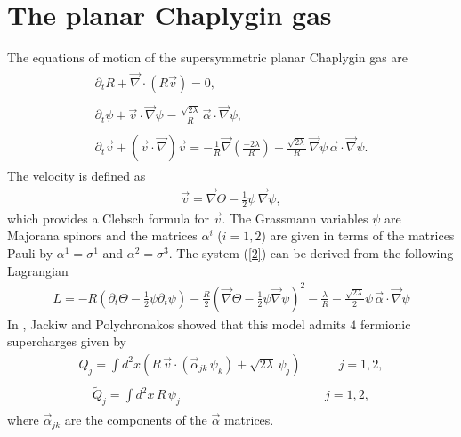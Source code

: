 \documentclass[11pt,a4paper]{article}
\let\ssection=\section
\renewcommand{\section}{\setcounter{equation}{0}\ssection}
\begin{document}
\section{The planar Chaplygin gas}
The equations of motion of the supersymmetric planar Chaplygin gas are
\begin{eqnarray}
\begin{array}{l}
\partial_t R+\vec{\nabla}\cdot(R\vec{v})=0,\\
[0.5mm]\\
\displaystyle{\partial_t\psi+\vec{v}\cdot\vec{\nabla}\psi=\frac{\sqrt{2\lambda}}{R}\,\vec{\alpha}\cdot\vec{\nabla}\psi},\\
[0.5mm]\\
\displaystyle{\partial_t\vec{v}+(\vec{v}\cdot\vec{\nabla})\vec{v}=
-\frac{1}{R}\vec{\nabla}\left(\frac{-2\lambda}{R}\right)+\frac{\sqrt{2\lambda}}{R}\,\vec{\nabla}\psi\,\vec{\alpha}\cdot\vec{\nabla}\psi}.
\end{array}
\label{2}
\end{eqnarray}
The velocity is defined as 
\begin{eqnarray}
\vec{v}=\vec{\nabla}\Theta-\frac{1}{2}\psi\,\vec{\nabla}\psi,
\label{clebsch}
\end{eqnarray}
which provides a Clebsch formula \cite{DESER} for $\vec{v}$. The Grassmann variables $\psi$ are Majorana spinors and the matrices $\alpha^i$ ($i=1, 2$) are given in terms of the matrices Pauli by $\alpha^1=\sigma^1$ and $\alpha^2=\sigma^3$. The system (\ref{2}) can be derived from the following Lagrangian
\begin{eqnarray}
L=-R\left(\partial_t\Theta-\frac{1}{2}\psi\partial_t\psi\right)-\frac{R}{2}\left(\vec{\nabla}\Theta-\frac{1}{2}\psi\vec{\nabla}\psi\right)^2-\frac{\lambda}{R}-\frac{\sqrt{2\lambda}}{2}\psi\,\vec{\alpha}\cdot\vec{\nabla}\psi
\label{3}
\end{eqnarray}
In \cite{JP}, Jackiw and Polychronakos showed that this model admits $4$ fermionic supercharges given by
\begin{eqnarray}
Q_j=\int d^2x\left(R\,\vec{v}\cdot(\vec{\alpha}_{jk}\,\psi_k)+\sqrt{2\lambda}\,\psi_j\right)\qquad\quad j=1, 2,
\label{4}
\end{eqnarray}
\begin{eqnarray}
\begin{array}{lcccccccccccccc}
\tilde{Q}_j=\int d^2x\,R\,\psi_j\qquad & & & & & & & & & & & & j=1, 2,
\label{5}
\end{array}
\end{eqnarray}
where $\vec{\alpha}_{jk}$ are the components of the $\vec{\alpha}$ matrices.
\end{document}
